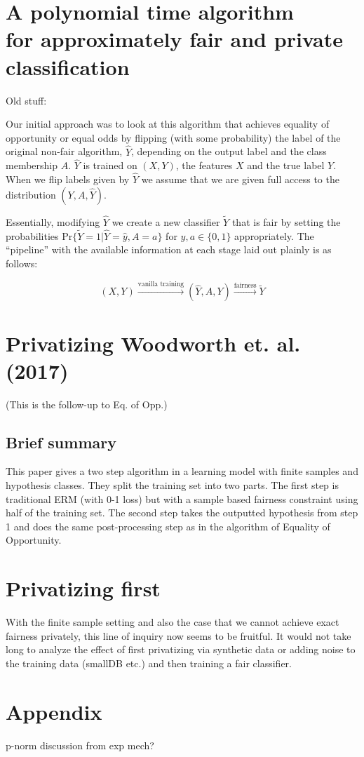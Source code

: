\documentclass[format = sigconf]{acmart}
\newcommand{\1}{\mathbbm{1}}
\theoremstyle{definition}
\begin{document}
\section{A polynomial time algorithm \\for approximately fair and private classification}
\clearpage

Old stuff:

Our initial approach was to look at this algorithm that achieves equality of opportunity or equal odds by flipping (with some probability) the label of the original non-fair algorithm, $\hat{Y}$, depending on the output label and the class membership $A$. $\hat{Y}$ is trained on $(X,Y)$, the features $X$ and the true label $Y$. When we flip labels given by $\hat{Y}$ we assume that we are given full access to the distribution $(Y,A,\hat{Y})$.

Essentially, modifying $\hat{Y}$ we create a new classifier $\tilde{Y}$ that is fair by setting the probabilities $\text{Pr}\{\tilde{Y} = 1 | \hat{Y} = \hat{y}, A = a \}$ for $\hat{y}, a \in \{0,1\}$ appropriately. The ``pipeline'' with the available information at each stage laid out plainly is as follows:

$$(X,Y) \xrightarrow[]{\text{vanilla training}} (\hat{Y},A,Y) \xrightarrow[]{\text{fairness}} \tilde{Y} $$


\section{Privatizing Woodworth et. al. (2017)}
(This is the follow-up to Eq. of Opp.)

\subsection{Brief summary}
This paper gives a two step algorithm in a learning model with finite samples and hypothesis classes. They split the training set into two parts. The first step is traditional ERM (with 0-1 loss) but with a sample based fairness constraint using half of the training set. The second step takes the outputted hypothesis from step 1 and does the same post-processing step as in the algorithm of Equality of Opportunity.


\section{Privatizing first}
With the finite sample setting and also the case that we cannot achieve exact fairness privately, this line of inquiry now seems to be fruitful. It would not take long to analyze the effect of first privatizing via synthetic data or adding noise to the training data (smallDB etc.) and then training a fair classifier.

\section{Appendix}
p-norm discussion from exp mech?
\end{document}
